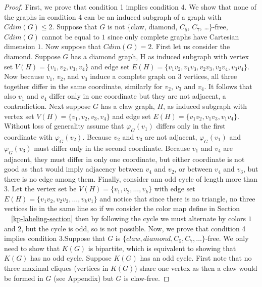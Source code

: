 \documentclass[12pt,a4paper,titlepage,openany]{report}
\begin{document}
\begin{proof}\sloppypar
First, we prove that condition 1 implies condition 4. We show that none of the graphs in condition 4 can be an induced subgraph of a graph with $Cdim(G)\leq 2$. Suppose that $G$ is not \{claw, diamond, $C_5$, $C_7$, \ldots\}-free, $Cdim(G)$ cannot be equal to $1$ since only complete graphs have Cartesian dimension $1$. Now suppose that $Cdim(G)=2$.
\newline First let us consider the diamond. Suppose $G$ has a diamond graph, H as induced subgraph with vertex set $V(H)=\{v_1,v_2,v_3,v_4\}$ and edge set $E(H)=\{v_1v_2,v_1v_3,v_2v_3,v_2v_4,v_3v_4\}$. Now because $v_1$, $v_2$, and $v_3$ induce a complete graph on $3$ vertices, all three together differ in the same coordinate, similarly for $v_2$, $v_3$ and $v_4$. It follows that also $v_1$ and $v_4$ differ only in one coordinate but they are not adjacent, a contradiction.
\newline Next suppose $G$ has a claw graph, $H$, as induced subgraph with vertex set $V(H)=\{v_1,v_2,v_3,v_4\}$ and edge set $E(H)=\{v_1v_2,v_1v_3,v_1v_4\}$. Without loss of generality assume that $\varphi_G(v_1)$ differs only in the first coordinate with $\varphi_G(v_2)$. Because $v_2$ and $v_3$ are not adjacent, $\varphi_G(v_1)$ and $\varphi_G(v_3)$ must differ only in the second coordinate. Because $v_1$ and $v_4$ are adjacent, they must differ in only one coordinate, but either coordinate is not good as that would  imply adjacency between $v_4$ and $v_2$, or between $v_4$ and $v_3$, but there is no edge among them.
\newline Finally, consider ann odd cycle of length more than 3. Let the vertex set be $V(H)=\{v_1,v_2,\ldots,v_k\}$ with edge set $E(H)=\{v_1v_2,v_2v_3,\ldots ,v_kv_1\}$ and notice that since there is no triangle, no three vertices lie in the same line so if we consider the color map define in Section ~~\ref{kp-labeling-section} then by following the cycle we must alternate by colors $1$ and $2$, but the cycle is odd, so is not possible.\newline
Now, we prove that condition 4 implies condition 3.\medskip \newline Suppose that $G$ is $\{claw, diamond, C_5, C_7, \ldots \}$-free. We only need to show that $K(G)$ is bipartite, which is equivalent to showing that $K(G)$ has no odd cycle. Suppose $K(G)$ has an odd cycle. First note that no three  maximal cliques (vertices in $K(G)$) share one vertex as then a claw would be formed in $G$ (see Appendix) but $G$ is claw-free. 


\end{proof}
\end{document}
